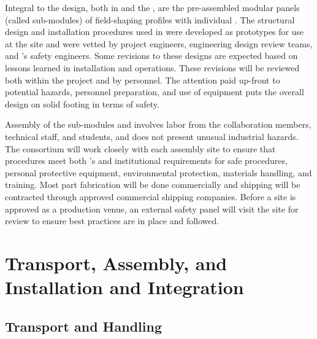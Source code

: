 Integral to the   design, both in  and the , %
are the pre-assembled modular panels (called  sub-modules) of field-shaping %
profiles with individual . %
The structural design and installation procedures used in  were %
developed as prototypes for use  %
at the  site and were vetted by project engineers, engineering design review teams, and 's safety engineers. Some revisions to these designs are expected based on lessons learned in  installation and operations. These revisions will be reviewed both within the  project and by   personnel. The attention paid up-front  to %
potential hazards, personnel preparation, and use of equipment puts the  overall   design 
on solid footing in terms of safety. 

Assembly of the  sub-modules and %
 involves labor from the collaboration members, technical staff, and students, and  does not present unusual industrial hazards. The  consortium will work closely with each assembly site 
 to ensure that procedures meet both \fnal{}'s and institutional requirements for safe procedures, personal protective equipment, environmental protection, %
materials handling, and training. Most %
part fabrication will be done commercially and shipping will be contracted through approved commercial shipping companies. Before a site is approved as a production venue, an external safety panel will visit the site for review to ensure best practices are in place and followed. 


\section{Transport, Assembly, and Installation and Integration}
\label{sec:fddp-hv-transport}

\subsection{Transport and Handling }
\label{sec:fddp-hv-transport-transport}

